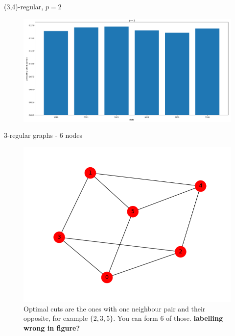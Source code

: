 \documentclass{beamer}
\begin{document}
\begin{frame}{(3,4)-regular, $p = 2$}
\begin{figure}
\centering
\includegraphics[scale=0.3,left]{figures/regular(3,4)-p2.png}
\end{figure}
\end{frame}

\begin{frame}{3-regular graphs - 6 nodes}
\begin{figure}
	\includegraphics[scale=0.6]{figures/regular(3,6)-graph.png}
	\caption*{Optimal cuts are the ones with one neighbour pair and their opposite, for example $\{2,3,5\}$. You can form 6 of those. \textbf{labelling wrong in figure?}}
\end{figure}
\end{frame}
\end{document}
